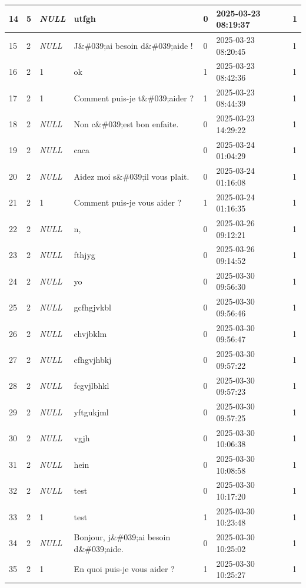 \begin{longtable}{|l|l|l|l|l|l|l|}
14 & 5 & \textit{NULL} & utfgh & 0 & 2025-03-23 08:19:37 & 1 \\ \hline 
15 & 2 & \textit{NULL} & J\&\#039;ai besoin d\&\#039;aide ! & 0 & 2025-03-23 08:20:45 & 1 \\ \hline 
16 & 2 & 1 & ok & 1 & 2025-03-23 08:42:36 & 1 \\ \hline 
17 & 2 & 1 & Comment puis-je t\&\#039;aider ? & 1 & 2025-03-23 08:44:39 & 1 \\ \hline 
18 & 2 & \textit{NULL} & Non c\&\#039;est bon enfaite. & 0 & 2025-03-23 14:29:22 & 1 \\ \hline 
19 & 2 & \textit{NULL} & caca & 0 & 2025-03-24 01:04:29 & 1 \\ \hline 
20 & 2 & \textit{NULL} & Aidez moi s\&\#039;il vous plait. & 0 & 2025-03-24 01:16:08 & 1 \\ \hline 
21 & 2 & 1 & Comment puis-je vous aider ? & 1 & 2025-03-24 01:16:35 & 1 \\ \hline 
22 & 2 & \textit{NULL} & n, & 0 & 2025-03-26 09:12:21 & 1 \\ \hline 
23 & 2 & \textit{NULL} & fthjyg & 0 & 2025-03-26 09:14:52 & 1 \\ \hline 
24 & 2 & \textit{NULL} & yo & 0 & 2025-03-30 09:56:30 & 1 \\ \hline 
25 & 2 & \textit{NULL} & gcfhgjvkbl & 0 & 2025-03-30 09:56:46 & 1 \\ \hline 
26 & 2 & \textit{NULL} & chvjbklm & 0 & 2025-03-30 09:56:47 & 1 \\ \hline 
27 & 2 & \textit{NULL} & cfhgvjhbkj & 0 & 2025-03-30 09:57:22 & 1 \\ \hline 
28 & 2 & \textit{NULL} & fcgvjlbhkl & 0 & 2025-03-30 09:57:23 & 1 \\ \hline 
29 & 2 & \textit{NULL} & yftgukjml & 0 & 2025-03-30 09:57:25 & 1 \\ \hline 
30 & 2 & \textit{NULL} & vgjh & 0 & 2025-03-30 10:06:38 & 1 \\ \hline 
31 & 2 & \textit{NULL} & hein & 0 & 2025-03-30 10:08:58 & 1 \\ \hline 
32 & 2 & \textit{NULL} & test & 0 & 2025-03-30 10:17:20 & 1 \\ \hline 
33 & 2 & 1 & test & 1 & 2025-03-30 10:23:48 & 1 \\ \hline 
34 & 2 & \textit{NULL} & Bonjour, j\&\#039;ai besoin d\&\#039;aide. & 0 & 2025-03-30 10:25:02 & 1 \\ \hline 
35 & 2 & 1 & En quoi puis-je vous aider ? & 1 & 2025-03-30 10:25:27 & 1 \\ \hline 

\end{longtable}

